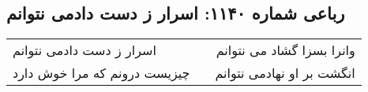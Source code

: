 \begin{center}
\section*{رباعی شماره ۱۱۴۰: اسرار ز دست دادمی نتوانم}
\label{sec:1140}
\begin{longtable}{l p{0.5cm} r}
اسرار ز دست دادمی نتوانم
&&
وانرا بسزا گشاد می نتوانم
\\
چیزیست درونم که مرا خوش دارد
&&
انگشت بر او نهادمی نتوانم
\\
\end{longtable}
\end{center}
